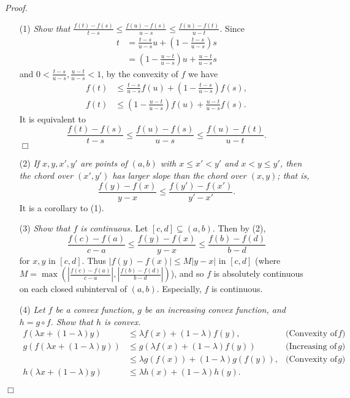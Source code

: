\documentclass{article}
\begin{document}
\emph{Proof.}
\begin{enumerate}
\item[(1)]
\emph{Show that
$\frac{f(t)-f(s)}{t-s}
\leq \frac{f(u)-f(s)}{u-s}
\leq \frac{f(u)-f(t)}{u-t}$.}
Since
\begin{align*}
  t
  &= \frac{t-s}{u-s} u + \left( 1-\frac{t-s}{u-s} \right) s \\
  &= \left( 1-\frac{u-t}{u-s} \right) u + \frac{u-t}{u-s} s
\end{align*}
and $0 < \frac{t-s}{u-s}, \frac{u-t}{u-s} < 1$,
by the convexity of $f$ we have
\begin{align*}
  f(t)
  &\leq \frac{t-s}{u-s} f(u) + \left( 1-\frac{t-s}{u-s} \right) f(s), \\
  f(t)
  &\leq \left( 1-\frac{u-t}{u-s} \right) f(u) + \frac{u-t}{u-s} f(s).
\end{align*}
It is equivalent to
$$\frac{f(t)-f(s)}{t-s}
\leq \frac{f(u)-f(s)}{u-s}
\leq \frac{f(u)-f(t)}{u-t}.$$
$\Box$\\
\item[(2)]
\emph{If $x, y, x', y'$ are points of $(a,b)$
with $x \leq x' < y'$ and $x < y \leq y'$,
then the chord over $(x',y')$ has larger slope than the chord over $(x,y)$; that is,
$$\frac{f(y)-f(x)}{y-x} \leq \frac{f(y')-f(x')}{y'-x'}.$$}
It is a corollary to (1).
\item[(3)]
\emph{Show that $f$ is continuous.}
Let $[c,d] \subseteq (a,b)$.
Then by (2),
$$\frac{f(c)-f(a)}{c-a}
\leq \frac{f(y) - f(x)}{y - x}
\leq \frac{f(b)-f(d)}{b-d}$$
for $x, y$ in $[c,d]$.
Thus $|f(y) - f(x)| \leq M|y - x|$ in $[c,d]$
(where $M = \max\left( |\frac{f(c)-f(a)}{c-a}|, |\frac{f(b)-f(d)}{b-d}| \right)$),
and so $f$ is absolutely continuous
on each closed subinterval of $(a,b)$.
Especially, $f$ is continuous.
\item[(4)]
\emph{Let $f$ be a convex function,
$g$ be an increasing convex function,
and $h = g \circ f$.
Show that $h$ is convex.}
\begin{align*}
f(\lambda x + (1-\lambda) y)
&\leq \lambda f(x) + (1-\lambda) f(y),
  &\text{(Convexity of $f$)} \\
g(f(\lambda x + (1-\lambda) y))
&\leq g(\lambda f(x) + (1-\lambda) f(y))
  &\text{(Increasing of $g$)} \\
&\leq \lambda g(f(x)) + (1-\lambda) g(f(y)),
  &\text{(Convexity of $g$)} \\
h(\lambda x + (1-\lambda) y)
&\leq \lambda h(x) + (1-\lambda) h(y).
\end{align*}
\end{enumerate}
$\Box$ \\\\
\end{document}
